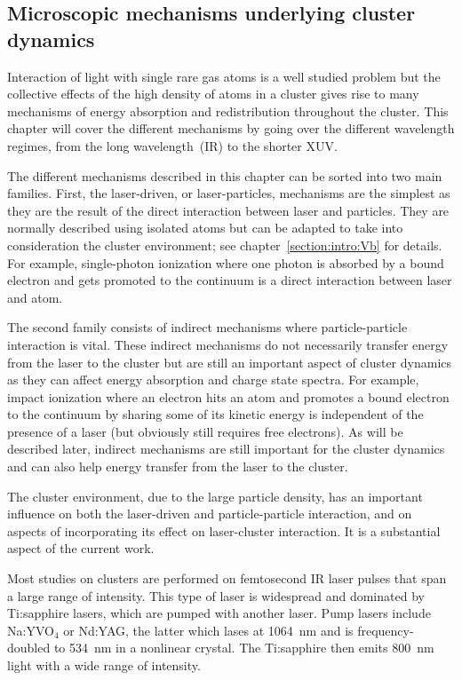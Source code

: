 \subsection{Microscopic mechanisms underlying cluster dynamics}
\label{section:intro:mechanisms}

Interaction of light with single rare gas atoms is a well studied problem but
the collective effects of the high density of atoms in a cluster gives rise to
many mechanisms of energy absorption and redistribution throughout the
cluster. This chapter will cover the different mechanisms by going over the
different wavelength regimes, from the long wavelength~(IR) to the shorter XUV.

The different mechanisms described in this chapter can be sorted into two main
families. First, the laser-driven, or laser-particles, mechanisms are the
simplest as they are the result of the direct interaction between laser
and particles. They are normally described using isolated atoms but can
be adapted to take into consideration the cluster environment; see
chapter~\ref{section:intro:Vb} for details. For example, single-photon ionization where
one photon is absorbed by a bound electron and gets promoted to the continuum is
a direct interaction between laser and atom.

The second family consists of indirect mechanisms where particle-particle
interaction is vital. These indirect mechanisms do not necessarily transfer
energy from the laser to the cluster but are still an important aspect of
cluster dynamics as they can affect energy absorption and charge state spectra.
For example, impact ionization where
an electron hits an atom and promotes a bound electron to the continuum by
sharing some of its kinetic energy is independent of the presence of a laser
(but obviously still requires free electrons). As will be described later,
indirect mechanisms are still important for the cluster dynamics and can also
help energy transfer from the laser to the cluster.

The cluster environment, due to the large particle density, has an important
influence on both the laser-driven and particle-particle interaction, and
on aspects of incorporating its effect on laser-cluster interaction.
It is a substantial aspect of the current work.

Most studies on clusters are performed on femtosecond IR laser
pulses that span a large range of intensity. This type of laser is
widespread and dominated by Ti:sapphire lasers, which are pumped with another laser.
Pump lasers include Na:YVO$_4$ or Nd:YAG, the latter which lases at 1064~nm and is
frequency-doubled to 534~nm in a nonlinear crystal. The Ti:sapphire then emits
800~nm light with a wide range of intensity.

